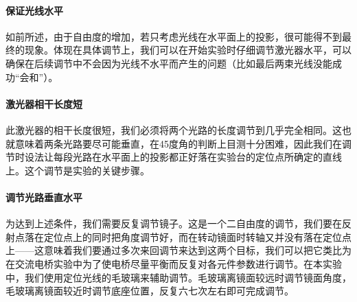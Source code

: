 \documentclass[10pt]{ctexart}
\begin{document}
\paragraph{保证光线水平}如前所述，由于自由度的增加，若只考虑光线在水平面上的投影，很可能得不到最终的现象。体现在具体调节上，我们可以在开始实验时仔细调节激光器水平，可以确保在后续调节中不会因为光线不水平而产生的问题（比如最后两束光线没能成功“会和”）。
\paragraph{激光器相干长度短}此激光器的相干长度很短，我们必须将两个光路的长度调节到几乎完全相同。这也就意味着两条光路要尽可能垂直，在45度角的判断上目测十分困难，因此我们在调节时设法让每段光路在水平面上的投影都正好落在实验台的定位点所确定的直线上。这个调节是实验的关键步骤。
\paragraph{调节光路垂直水平}为达到上述条件，我们需要反复调节镜子。这是一个二自由度的调节，我们要在反射点落在定位点上的同时把角度调节好，而在转动镜面时转轴又并没有落在定位点上——这意味着我们要通过多次来回调节来达到这两个目标，我们可以把它类比为在交流电桥实验中为了使电桥尽量平衡而反复对各元件参数进行调节。在本实验中，我们使用定位光线的毛玻璃来辅助调节。毛玻璃离镜面较远时调节镜面角度，毛玻璃离镜面较近时调节底座位置，反复六七次左右即可完成调节。
\end{document}
